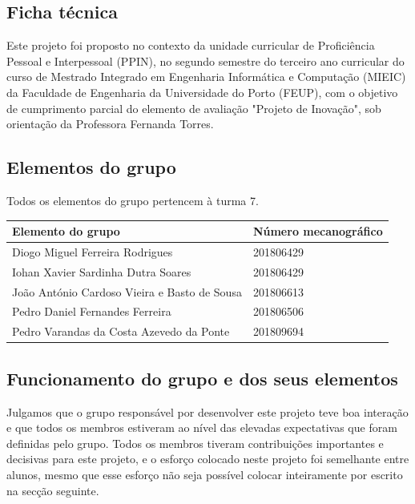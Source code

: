 \documentclass[11pt, a4paper, oneside]{book}
\begin{document}
\renewcommand{\appendixtocname}{Anexos}
\renewcommand{\appendixpagename}{Anexos}
\begin{appendices}
\chapter{Ficha técnica}

Este projeto foi proposto no contexto da unidade curricular de Proficiência Pessoal e Interpessoal (PPIN), no segundo semestre do terceiro ano curricular do curso de Mestrado Integrado em Engenharia Informática e Computação (MIEIC) da Faculdade de Engenharia da Universidade do Porto (FEUP), com o objetivo de cumprimento parcial do elemento de avaliação "Projeto de Inovação", sob orientação da Professora Fernanda Torres.

\section{Elementos do grupo}

Todos os elementos do grupo pertencem à turma 7.

\begin{center}
\begin{tabular}{@{} l l@{}}
    \textbf{Elemento do grupo} & \textbf{Número mecanográfico} \\ \hline
    Diogo Miguel Ferreira Rodrigues & 201806429 \\
    Iohan Xavier Sardinha Dutra Soares & 201806429 \\
    João António Cardoso Vieira e Basto de Sousa & 201806613 \\
    Pedro Daniel Fernandes Ferreira & 201806506 \\
    Pedro Varandas da Costa Azevedo da Ponte & 201809694
\end{tabular}
\end{center}

\section{Funcionamento do grupo e dos seus elementos}

Julgamos que o grupo responsável por desenvolver este projeto teve boa interação e que todos os membros estiveram ao nível das elevadas expectativas que foram definidas pelo grupo. Todos os membros tiveram contribuições importantes e decisivas para este projeto, e o esforço colocado neste projeto foi semelhante entre alunos, mesmo que esse esforço não seja possível colocar inteiramente por escrito na secção seguinte.


\end{appendices}
\end{document}
